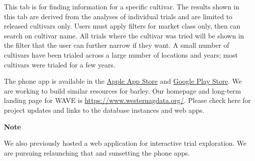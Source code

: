 \documentclass[
  letterpaper,
  DIV=11,
  numbers=noendperiod]{scrreprt}
\begin{document}
\begin{tcolorbox}[enhanced jigsaw, bottomrule=.15mm, opacityback=0, colback=white, left=2mm, titlerule=0mm, breakable, colframe=quarto-callout-color-frame, colbacktitle=quarto-callout-color!10!white, toprule=.15mm, rightrule=.15mm, coltitle=black, title={Cultivar Explorer}, leftrule=.75mm, toptitle=1mm, bottomtitle=1mm, arc=.35mm, opacitybacktitle=0.6]

This tab is for finding information for a specific cultivar. The results
shown in this tab are derived from the analyses of individual trials and
are limited to released cultivars only. Users must apply filters for
market class only, then can search on cultivar name. All trials where
the cultivar was tried will be shown in the filter that the user can
further narrow if they want. A small number of cultivars have been
trialed across a large number of locations and years; most cultivars
were trialed for a few years.

\end{tcolorbox}

The phone app is available in the
\href{https://apps.apple.com/us/app/u-of-i-wave/id6476321661}{Apple App
Store} and
\href{https://play.google.com/store/apps/details?id=com.uidaho.rcds.wave}{Google
Play Store}. We are working to build similar resources for barley. Our
homepage and long-term landing page for WAVE is
\url{https://www.westernagdata.org/}. Please check here for project
updates and links to the database instances and web apps.

\begin{tcolorbox}[enhanced jigsaw, toprule=.15mm, bottomrule=.15mm, opacityback=0, arc=.35mm, colback=white, left=2mm, rightrule=.15mm, leftrule=.75mm, breakable, colframe=quarto-callout-note-color-frame]
\begin{minipage}[t]{5.5mm}
\textcolor{quarto-callout-note-color}{\faInfo}
\end{minipage}%
\begin{minipage}[t]{\textwidth - 5.5mm}

\vspace{-3mm}\textbf{Note}\vspace{3mm}

We also previously hosted a web application for interactive trial
exploration. We are pursuing relaunching that and sunsetting the phone
apps.

\end{minipage}%
\end{tcolorbox}
\end{document}

